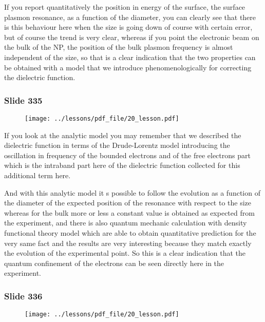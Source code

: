 \documentclass[../main/main.tex]{subfiles}
\begin{document}
If you report quantitatively the position in energy of the surface, the surface plasmon resonance, as a function of the diameter, you can clearly see that there is this behaviour here when the size is going down of course with certain error, but of course the trend is very clear, whereas if you point the electronic beam on the bulk of the NP, the position of the bulk plasmon frequency is almost independent of the size, so that is a clear indication that the two properties can be obtained with a model that we introduce phenomenologically for correcting the dielectric function.

\newpage

\subsubsection{Slide 335}

\begin{figure}[h!]
\centering
\texttt{[image: ../lessons/pdf\_file/20\_lesson.pdf]}
\end{figure}

If you look at the analytic model you may remember that we described the dielectric function in terms of the Drude-Lorentz model introducing the oscillation in frequency of the bounded electrons and of the free electrons part which is the intraband part here of the dielectric function collected for this additional term here.

And with this analytic model it s possible to follow the evolution as a function of the diameter of the expected position of the resonance with respect to the size whereas for the bulk more or less a constant value is obtained as expected from the experiment, and there is also quantum mechanic calculation with density functional theory model which are able to obtain quantitative prediction for the very same fact and the results are very interesting because they match exactly the evolution of the experimental point. So this is a clear indication that the quantum confinement of the electrons can be seen directly here in the experiment.

\newpage

\subsubsection{Slide 336}

\begin{figure}[h!]
\centering
\texttt{[image: ../lessons/pdf\_file/20\_lesson.pdf]}
\end{figure}
\end{document}

